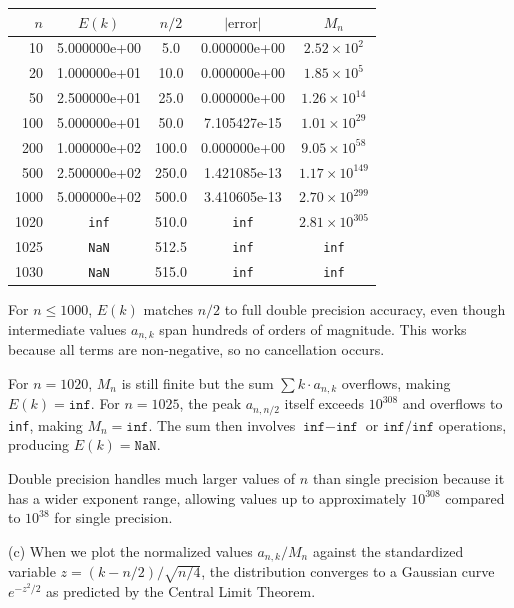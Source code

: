 \documentclass[letterpaper, 11pt]{article}
\newcommand{\1}{\mathds{1}}	%
\theoremstyle{definition}
\begin{document}
\begin{center}
\begin{tabular}{r|cccc}
$n$ & $E(k)$ & $n/2$ & $|\text{error}|$ & $M_n$ \\
\hline
10 & 5.000000e+00 & 5.0 & 0.000000e+00 & $2.52 \times 10^{2}$ \\
20 & 1.000000e+01 & 10.0 & 0.000000e+00 & $1.85 \times 10^{5}$ \\
50 & 2.500000e+01 & 25.0 & 0.000000e+00 & $1.26 \times 10^{14}$ \\
100 & 5.000000e+01 & 50.0 & 7.105427e-15 & $1.01 \times 10^{29}$ \\
200 & 1.000000e+02 & 100.0 & 0.000000e+00 & $9.05 \times 10^{58}$ \\
500 & 2.500000e+02 & 250.0 & 1.421085e-13 & $1.17 \times 10^{149}$ \\
1000 & 5.000000e+02 & 500.0 & 3.410605e-13 & $2.70 \times 10^{299}$ \\
1020 & \texttt{inf} & 510.0 & \texttt{inf} & $2.81 \times 10^{305}$ \\
1025 & \texttt{NaN} & 512.5 & \texttt{inf} & \texttt{inf} \\
1030 & \texttt{NaN} & 515.0 & \texttt{inf} & \texttt{inf}
\end{tabular}
\end{center}

For $n \leq 1000$, $E(k)$ matches $n/2$ to full double precision accuracy, even though intermediate values $a_{n,k}$ span hundreds of orders of magnitude. This works because all terms are non-negative, so no cancellation occurs.

For $n = 1020$, $M_n$ is still finite but the sum $\sum k \cdot a_{n,k}$ overflows, making $E(k) = \texttt{inf}$. For $n = 1025$, the peak $a_{n,n/2}$ itself exceeds $10^{308}$ and overflows to \texttt{inf}, making $M_n = \texttt{inf}$. The sum then involves $\texttt{inf} - \texttt{inf}$ or $\texttt{inf}/\texttt{inf}$ operations, producing $E(k) = \texttt{NaN}$.

Double precision handles much larger values of $n$ than single precision because it has a wider exponent range, allowing values up to approximately $10^{308}$ compared to $10^{38}$ for single precision.

(c) When we plot the normalized values $a_{n,k}/M_n$ against the standardized variable $z = (k - n/2)/\sqrt{n/4}$, the distribution converges to a Gaussian curve $e^{-z^2/2}$ as predicted by the Central Limit Theorem.
\end{document}
